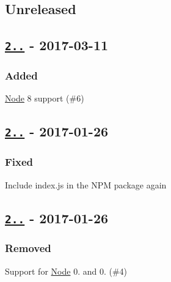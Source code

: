 \subsection*{Unreleased}

\subsection*{\href{https://github.com/malept/sumchecker/compare/v2.0.1...v2.0.2}{\tt 2..} -\/ 2017-\/03-\/11}

\subsubsection*{Added}


\begin{DoxyItemize}
\item \mbox{\hyperlink{classNode}{Node}} 8 support (\#6)
\end{DoxyItemize}

\subsection*{\href{https://github.com/malept/sumchecker/compare/v2.0.0...v2.0.1}{\tt 2..} -\/ 2017-\/01-\/26}

\subsubsection*{Fixed}


\begin{DoxyItemize}
\item Include {\ttfamily index.\+js} in the N\+PM package again
\end{DoxyItemize}

\subsection*{\href{https://github.com/malept/sumchecker/compare/v1.3.0...v2.0.0}{\tt 2..} -\/ 2017-\/01-\/26}

\subsubsection*{Removed}


\begin{DoxyItemize}
\item Support for \mbox{\hyperlink{classNode}{Node}} 0. and 0. (\#4)
\end{DoxyItemize}

